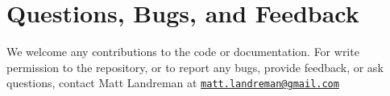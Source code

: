 \section{Questions, Bugs, and Feedback}

We welcome any contributions to the code or documentation.
For write permission to the repository, or to report any bugs, provide feedback, or ask questions, contact Matt Landreman at
\href{mailto:matt.landreman@gmail.com}{\nolinkurl{matt.landreman@gmail.com} }






